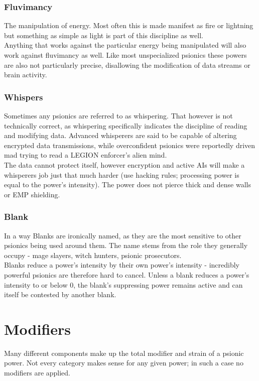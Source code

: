 \documentclass[12pt,a4paper,openany,usenames,dvipsnames]{book}
\begin{document}
	\subsubsection*{Fluvimancy}
	The manipulation of energy. Most often this is made manifest as fire or lightning but something as simple as light is part of this discipline as well.\\
	Anything that works against the particular energy being manipulated will also work against fluvimancy as well. Like most unspecialized psionics these powers are also not particularly precise, disallowing the modification of data streams or brain activity.
	\subsubsection*{Whispers}
	Sometimes any psionics are referred to as whispering.
	That however is not technically correct, as whispering specifically indicates the discipline of reading and modifying data.
	Advanced whisperers are said to be capable of altering encrypted data transmissions,
		while overconfident psionics were reportedly driven mad trying to read a LEGION enforcer's alien mind.\\
	The data cannot protect itself, however encryption and active AIs will make a whisperers job just that much harder (use hacking rules; processing power is equal to the power's intensity). The power does not pierce thick and dense walls or EMP shielding.
	\subsubsection*{Blank}
	In a way Blanks are ironically named, as they are the most sensitive to other psionics being used around them. The name stems from the role they generally occupy - mage slayers, witch hunters, psionic prosecutors.\\
	Blanks reduce a power's intensity by their own power's intensity - incredibly powerful psionics are therefore hard to cancel. Unless a blank reduces a power's intensity to or below 0, the blank's suppressing power remains active and can itself be contested by another blank.
	\section{Modifiers}
	Many different components make up the total modifier and strain of a psionic power. Not every category makes sense for any given power; in such a case no modifiers are applied.
\end{document}

